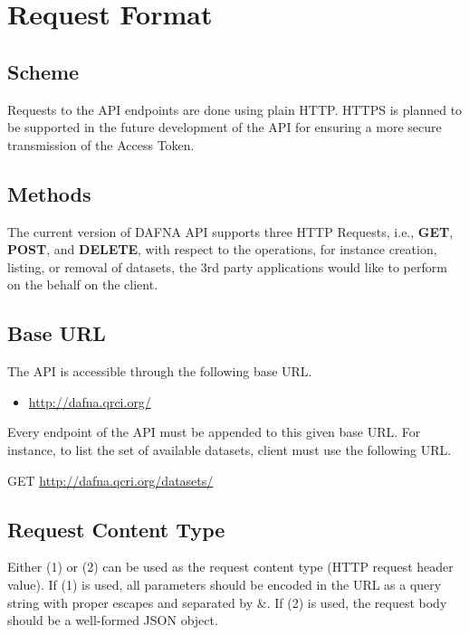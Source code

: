 \documentclass[a4paper,10pt]{scrartcl}
\begin{document}
\normalsize


\section{Request Format}
\subsection{Scheme}
Requests to the API endpoints are done using plain HTTP. HTTPS is planned to be supported 
in the future development of the API for ensuring a more secure transmission of the Access 
Token.
\subsection{Methods}
The current version of DAFNA API supports three HTTP Requests, i.e., \textbf{GET}, \textbf{POST}, and \textbf{DELETE}, 
with respect to the operations, for instance creation, listing, or removal of datasets, the 3rd party applications would
like to perform on the behalf on the client.
\subsection{Base URL}
The API is accessible through the following base URL.
\begin{itemize}
 \item \href{http://dafna.qrci.org/}{http://dafna.qrci.org/}
\end{itemize}
Every endpoint of the API must be appended to this given base URL.
For instance, to list the set of available datasets, client must use 
the following URL.
\begin{description}
\item GET \href{http://dafna.qcri.org/datasets/}{http://dafna.qcri.org/datasets/} 
\end{description}
\subsection{Request Content Type}
Either (1)  or (2)  can be used as the request content type (HTTP request 
header value). If (1) is used, all parameters should be encoded in the URL as a query string with proper escapes and separated by \&. If (2) is used, the request body should 
be a well-formed JSON object. 
\end{document}
